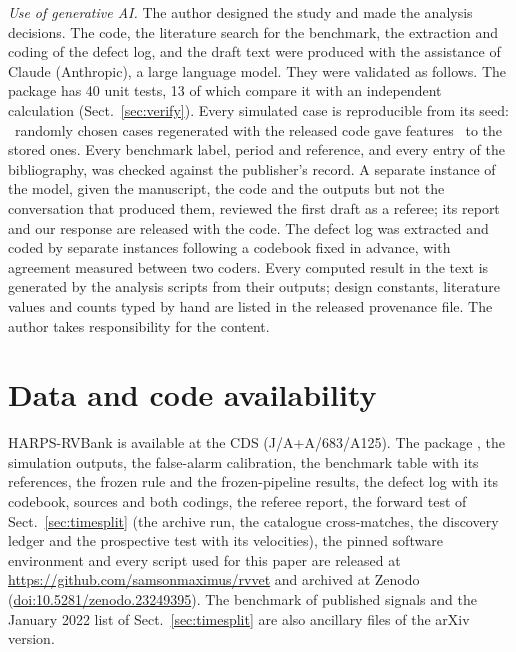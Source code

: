 \emph{Use of generative AI.} The author designed the study and made the analysis
decisions. The code, the literature search for the benchmark, the extraction and coding
of the defect log, and the draft text were produced with the assistance of Claude
(Anthropic), a large language model. They were validated as follows. The package has 40
unit tests, 13 of which compare it with an independent calculation
(Sect.~\ref{sec:verify}). Every simulated case is reproducible from its seed: \nmConsistN\ randomly chosen
cases regenerated with the released code gave features \nmConsistDiff\ to the stored
ones. Every
benchmark label, period and reference, and every entry of the bibliography, was checked
against the publisher's record. A separate instance of the model, given the manuscript,
the code and the outputs but not the conversation that produced them, reviewed the first
draft as a referee; its report and our response are released with the code. The defect
log was extracted and coded by separate instances following a codebook fixed in
advance, with agreement measured between two coders. Every computed result in the
text is generated by the analysis scripts from their outputs; design constants, literature
values and counts typed by hand are listed in the released provenance file. The author takes responsibility for the content.

\section*{Data and code availability}

HARPS-RVBank is available at the CDS (J/A+A/683/A125). The package , the
simulation outputs, the false-alarm calibration, the benchmark table with its
references, the frozen rule and the frozen-pipeline results, the defect log with its
codebook, sources and both codings, the referee report, the forward test of
Sect.~\ref{sec:timesplit} (the archive run, the catalogue cross-matches, the discovery ledger
and the prospective test with its velocities), the pinned software environment and every
script used for this paper are released at \url{https://github.com/samsonmaximus/rvvet} and archived at Zenodo
(\href{https://doi.org/10.5281/zenodo.23249395}{doi:10.5281/zenodo.23249395}).
The benchmark of published signals and the January 2022 list of Sect.~\ref{sec:timesplit}
are also ancillary files of the arXiv version.




\clearpage
\appendix
